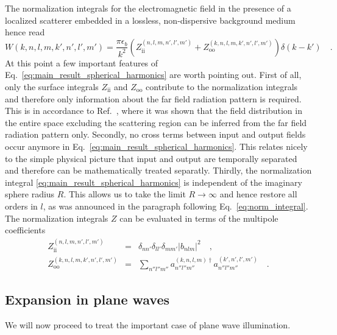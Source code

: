 \documentclass[10pt,letterpaper]{article}
\begin{document}
The normalization integrals for the electromagnetic field in the presence of a localized scatterer embedded in a lossless, non-dispersive background medium hence read
\begin{equation} \label{eq:main_result_spherical_harmonics}
W(k,n,l,m,k',n',l',m') = \frac{\pi\epsilon_b}{k^2}\left(Z_{\text{ii}}^{(n,l,m,n',l',m')}+Z_{\text{oo}}^{(k,n,l,m,k',n',l',m')}\right)\delta(k-k') \quad .
\end{equation}
At this point a few important features of Eq.~\eqref{eq:main_result_spherical_harmonics} are worth pointing out. First of all, only the surface integrals $Z_{\text{ii}}$ and $Z_{\text{oo}}$ contribute to the normalization integrals and therefore only information about the far field radiation pattern is required. This is in accordance to Ref.~\cite{Devaney1974}, where it was shown that the field distribution in the entire space excluding the scattering region can be inferred from the far field radiation pattern only. Secondly, no cross terms between input and output fields occur anymore in Eq.~\eqref{eq:main_result_spherical_harmonics}. This relates nicely to the simple physical picture that input and output are temporally separated and therefore can be mathematically treated separatly. Thirdly, the normalization integral \eqref{eq:main_result_spherical_harmonics} is independent of the imaginary sphere radius $R$. This allows us to take the limit $R\rightarrow\infty$ and hence restore all orders in $l$, as was announced in the paragraph following Eq.~\ref{eq:norm_integral}. The normalization integrals $Z$ can be evaluated in terms of the multipole coefficients
\begin{eqnarray}
Z_{\text{ii}}^{(n,l,m,n',l',m')} &=& \delta_{nn'}\delta_{ll'}\delta_{mm'}\left|b_{nlm}\right|^2 \quad , \\
Z_{\text{oo}}^{(k,n,l,m,k',n',l',m')} &=& \sum_{n''l''m''}a_{n''l''m''}^{(k,n,l,m)\dagger}a_{n''l''m''}^{(k',n',l',m')} \quad . \label{eq:norm_multipole_representation}
\end{eqnarray}

\subsection{Expansion in plane waves}
\label{sec:plane_waves}

We will now proceed to treat the important case of plane wave illumination.
\end{document}
